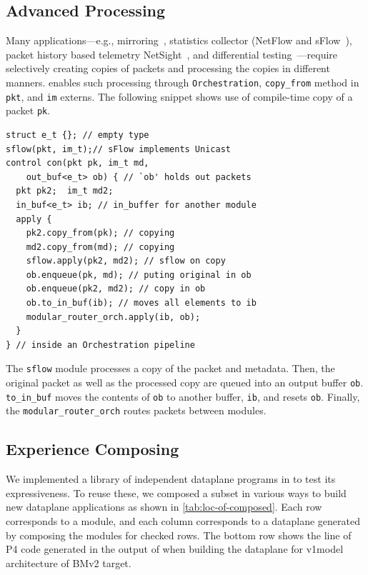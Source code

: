\documentclass[letterpaper,twocolumn,10pt]{article}
\begin{document}
\subsection{Advanced Processing}
Many applications---e.g., mirroring~\cite{rasley2014planck},
statistics collector (NetFlow and
sFlow~\cite{panchen2001inmon}), packet history based telemetry 
NetSight~\cite{179783}, and differential
testing~\cite{Zheng:2018:PLV:3281411.3281436}---require selectively
creating copies of packets and processing the copies in different
manners. \ulang enables such processing through
\texttt{Orchestration}, \texttt{copy\_from} method in \texttt{pkt},
and \texttt{im} externs. The following snippet shows use of
compile-time copy of a packet \texttt{pk}.
\begin{lstlisting}[frame=none]
struct e_t {}; // empty type
sflow(pkt, im_t);// sFlow implements Unicast
control con(pkt pk, im_t md, 
    out_buf<e_t> ob) { // `ob' holds out packets
  pkt pk2;  im_t md2;
  in_buf<e_t> ib; // in_buffer for another module
  apply {
    pk2.copy_from(pk); // copying
    md2.copy_from(md); // copying
    sflow.apply(pk2, md2); // sflow on copy
    ob.enqueue(pk, md); // puting original in ob
    ob.enqueue(pk2, md2); // copy in ob
    ob.to_in_buf(ib); // moves all elements to ib
    modular_router_orch.apply(ib, ob);
  }
} // inside an Orchestration pipeline
\end{lstlisting}
The \texttt{sflow} module processes a copy of the packet and metadata.
Then, the original packet as well as the processed copy are queued
into an output buffer \texttt{ob}. \texttt{to\_in\_buf} moves the
contents of \texttt{ob} to another buffer, \texttt{ib}, and resets
\texttt{ob}. Finally, the \texttt{modular\_router\_orch} routes
packets between modules.






\subsection{Experience Composing \uprograms}
We implemented a library of independent dataplane programs in
\ulang to test its expressiveness. To reuse these, we composed a
subset in various ways to build new dataplane applications as shown in
\cref{tab:loc-of-composed}. Each row corresponds to a module, and each
column corresponds to a dataplane generated by composing the modules
for checked rows.
The bottom row shows the line of P4 code generated in the output of
\ucomp when building the dataplane for  v1model~\cite{v1model.p4}
architecture of BMv2 target.
\end{document}

